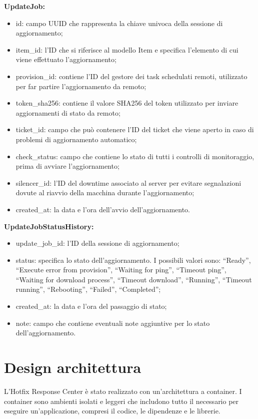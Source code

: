 \noindent \textbf{UpdateJob:}
\begin{itemize}
\item id: campo UUID che rappresenta la chiave univoca della sessione di aggiornamento;
\item item\_id: l'ID che si riferisce al modello Item e specifica l'elemento di cui viene effettuato l'aggiornamento;
\item provision\_id: contiene l'ID del gestore dei task schedulati remoti, utilizzato per far partire l'aggiornamento da remoto;
\item token\_sha256: contiene il valore SHA256 del token utilizzato per inviare aggiornamenti di stato da remoto;
\item ticket\_id: campo che può contenere l'ID del ticket che viene aperto in caso di problemi di aggiornamento automatico;
\item check\_status: campo che contiene lo stato di tutti i controlli di monitoraggio, prima di avviare l'aggiornamento;
\item silencer\_id: l'ID del downtime associato al server per evitare segnalazioni dovute al riavvio della macchina durante l'aggiornamento;
\item created\_at: la data e l'ora dell'avvio dell'aggiornamento.
\end{itemize}

\noindent \textbf{UpdateJobStatusHistory:}
\begin{itemize}
\item update\_job\_id:  l'ID della sessione di aggiornamento;
\item status: specifica lo stato dell'aggiornamento. I possibili valori sono: “Ready”, 
“Execute error from provision”, “Waiting for ping”, “Timeout ping”, 
“Waiting for download process”, “Timeout download”, “Running”, “Timeout running”, “Rebooting”, 
“Failed”, “Completed”;
\item created\_at: la data e l'ora del passaggio di stato;
\item note: campo che contiene eventuali note aggiuntive per lo stato dell'aggiornamento.
\end{itemize}


\section{Design architettura}
L’Hotfix Response Center è stato realizzato con un’architettura a container. 
I container sono ambienti isolati e leggeri che includono tutto il necessario 
per eseguire un'applicazione, compresi il codice, le dipendenze e le librerie.

